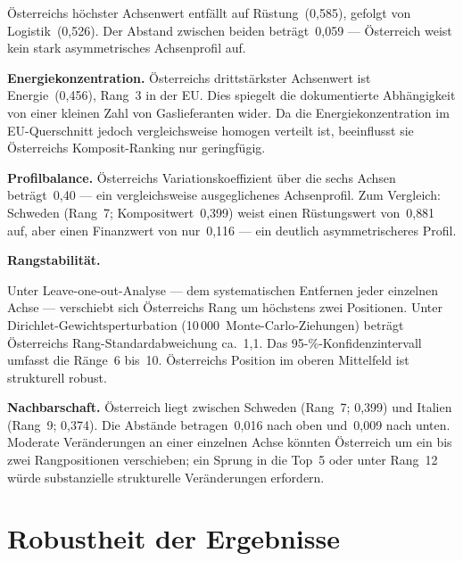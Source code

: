\begin{sloppypar}
\"Osterreichs h\"ochster Achsenwert entf\"allt auf
R\"ustung~(0{,}585), gefolgt von Logistik~(0{,}526).  Der Abstand
zwischen beiden betr\"agt~0{,}059 --- \"Osterreich weist kein
stark asymmetrisches Achsen\-profil auf.
\end{sloppypar}

\textbf{Energiekonzentration.}
\"Osterreichs drittst\"arkster Achsenwert ist Energie~(0{,}456),
Rang~3 in der EU.  Dies spiegelt die dokumentierte Abh\"angigkeit
von einer kleinen Zahl von Gaslieferanten wider.  Da die
Energie\-konzentration im EU-Querschnitt jedoch vergleichsweise
homogen verteilt ist, beeinflusst sie \"Osterreichs
Komposit-Ranking nur geringf\"ugig.

\begin{sloppypar}
\textbf{Profilbalance.}
\"Osterreichs Variations\-koeffizient \"uber die sechs Achsen
betr\"agt~0{,}40 --- ein vergleichsweise ausgeglichenes
Achsen\-profil.  Zum Vergleich: Schweden (Rang~7;
Kompositwert~0{,}399) weist einen R\"ustungswert von~0{,}881 auf,
aber einen Finanzwert von nur~0{,}116 --- ein deutlich
asymmetrischeres Profil.
\end{sloppypar}

\textbf{Rangstabilit\"at.}
\begin{sloppypar}
Unter Leave-one-out-Analyse --- dem systematischen Entfernen jeder
einzelnen Achse --- verschiebt sich \"Osterreichs Rang um
h\"ochstens zwei Positionen.  Unter
Dirichlet-Gewichts\-perturbation (10\,000~Monte-Carlo-Ziehungen)
betr\"agt \"Osterreichs Rang-Standard\-abweichung ca.~1{,}1.  Das
95-\%-Konfidenz\-intervall umfasst die R\"ange~6 bis~10.
\"Osterreichs Position im oberen Mittelfeld ist strukturell robust.
\end{sloppypar}

\textbf{Nachbarschaft.}
\"Osterreich liegt zwischen Schweden (Rang~7; 0{,}399) und
Italien (Rang~9; 0{,}374).  Die Abst\"ande betragen~0{,}016 nach
oben und~0{,}009 nach unten.  Moderate Ver\"anderungen an einer
einzelnen Achse k\"onnten \"Osterreich um ein bis zwei
Rangpositionen verschieben; ein Sprung in die Top~5 oder unter
Rang~12 w\"urde substanzielle strukturelle Ver\"anderungen
erfordern.


\section{Robustheit der Ergebnisse}
\label{sec:robustheit}

